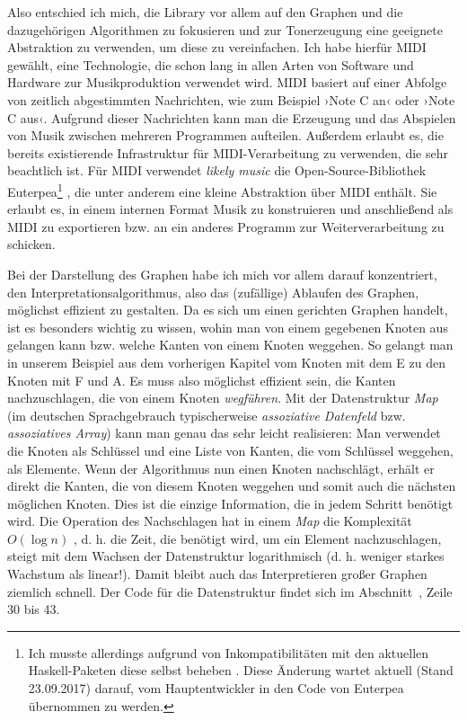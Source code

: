 \documentclass[a4paper,twocolumn]{article}
\begin{document}
Also entschied ich mich, die Library vor allem auf den Graphen und die
dazugehörigen Algorithmen zu fokusieren und zur Tonerzeugung eine geeignete
Abstraktion zu verwenden, um diese zu vereinfachen. Ich habe hierfür MIDI
gewählt, eine Technologie, die schon lang in allen Arten von Software und
Hardware zur Musikproduktion verwendet wird. MIDI basiert auf einer
Abfolge von zeitlich abgestimmten Nachrichten, wie zum Beispiel ›Note C an‹ oder
›Note C aus‹. Aufgrund dieser Nachrichten kann man die Erzeugung und das
Abspielen von Musik zwischen mehreren Programmen aufteilen. Außerdem erlaubt es,
die bereits existierende Infrastruktur für MIDI-Verarbeitung zu verwenden, die
sehr beachtlich ist. Für MIDI verwendet {\it likely music} die
Open-Source-Bibliothek Euterpea\footnote{Ich musste allerdings aufgrund von
Inkompatibilitäten mit den aktuellen Haskell-Paketen diese selbst beheben
\cite{euterpea_fork}. Diese Änderung wartet \cite{euterpea_issue} aktuell (Stand
23.09.2017) darauf, vom Hauptentwickler
in den Code von Euterpea übernommen zu werden.}
\cite{euterpea}, die unter anderem eine kleine Abstraktion über MIDI enthält.
Sie erlaubt es, in einem internen Format Musik zu
konstruieren und anschließend als MIDI zu exportieren bzw. an ein anderes
Programm zur Weiterverarbeitung zu schicken.

Bei der Darstellung des Graphen habe ich mich vor allem darauf konzentriert,
den Interpretationsalgorithmus, also das (zufällige) Ablaufen des Graphen,
möglichst effizient zu gestalten. Da es sich um einen gerichten Graphen handelt,
ist es besonders wichtig zu wissen, wohin man von einem gegebenen Knoten aus
gelangen kann bzw. welche Kanten von einem Knoten weggehen. So gelangt man in unserem Beispiel
aus dem vorherigen Kapitel vom Knoten mit dem E zu den Knoten mit F und
A. Es muss also möglichst effizient sein, die Kanten nachzuschlagen, die von
einem Knoten {\it wegführen}. Mit der Datenstruktur {\it Map} \cite{map} (im
deutschen Sprachgebrauch typischerweise {\it assoziative Datenfeld} bzw. {\it
assoziatives Array}) kann
man genau das sehr leicht realisieren: Man verwendet die Knoten als Schlüssel und
eine Liste von Kanten, die vom Schlüssel weggehen, als Elemente. Wenn
der Algorithmus nun einen Knoten nachschlägt, erhält er direkt die Kanten, die
von diesem Knoten weggehen und somit auch die nächsten möglichen Knoten. Dies
ist die einzige Information, die in jedem Schritt benötigt wird. Die Operation
des Nachschlagen hat in einem {\it Map} die Komplexität $O(\log n)$
\cite{map_lookup}, d. h. die Zeit, die benötigt wird, um ein Element
nachzuschlagen, steigt mit dem Wachsen der Datenstruktur logarithmisch
(d. h. weniger starkes Wachstum als linear!). Damit bleibt auch das Interpretieren
großer Graphen ziemlich schnell. Der Code für die Datenstruktur findet
sich im Abschnitt~, Zeile 30 bis 43.
\end{document}
